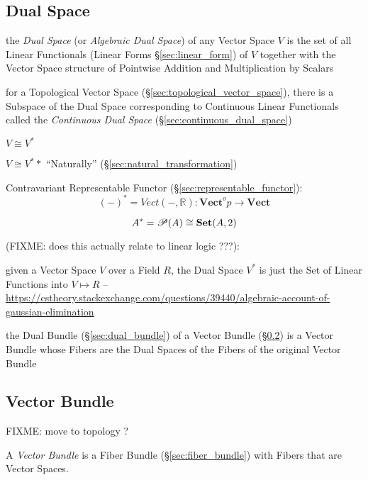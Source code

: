 \subsection{Dual Space}\label{sec:dual_space}

the \emph{Dual Space} (or \emph{Algebraic Dual Space}) of any Vector Space $V$
is the set of all Linear Functionals (Linear Forms \S\ref{sec:linear_form}) of
$V$ together with the Vector Space structure of Pointwise Addition and
Multiplication by Scalars

for a Topological Vector Space (\S\ref{sec:topological_vector_space}), there is
a Subspace of the Dual Space corresponding to Continuous Linear Functionals
called the \emph{Continuous Dual Space} (\S\ref{sec:continuous_dual_space})

$V \cong V^*$

$V \cong V^**$ ``Naturally'' (\S\ref{sec:natural_transformation})

Contravariant Representable Functor
(\S\ref{sec:representable_functor}):
\[
  (-)^* = Vect(-,\mathbb{R}) :
    \mathbf{Vect}^op \rightarrow \mathbf{Vect}
\]

\[
  A^* = \mathscr{P}(A) \cong \mathbf{Set}(A,2)
\]\cite{awodey06}

(FIXME: does this actually relate to linear logic ???):

given a Vector Space $V$ over a Field $R$, the Dual Space $V^*$ is just the Set
of Linear Functions into $V \mapsto R$
--\url{https://cstheory.stackexchange.com/questions/39440/algebraic-account-of-gaussian-elimination}

the Dual Bundle (\S\ref{sec:dual_bundle}) of a Vector Bundle
(\S\ref{sec:vector_bundle}) is a Vector Bundle whose Fibers are the Dual Spaces
of the Fibers of the original Vector Bundle



\subsection{Vector Bundle}\label{sec:vector_bundle}

FIXME: move to topology ?

A \emph{Vector Bundle} is a Fiber Bundle (\S\ref{sec:fiber_bundle}) with Fibers
that are Vector Spaces.

